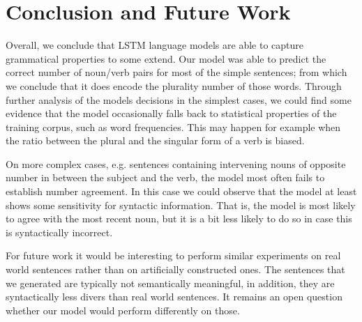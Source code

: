 \documentclass[11pt,a4paper]{article}
\begin{document}





\section{Conclusion and Future Work}
\label{conclusion}


Overall, we conclude that LSTM language models
are able to capture grammatical properties to some extend.
Our model was able to predict the correct number of noun/verb pairs 
for most of the simple sentences;
from which we conclude that it does encode the plurality number of those words. 
Through further analysis of the models decisions in the simplest cases, we could find some evidence that the model occasionally falls back to statistical properties of the training corpus, such as word frequencies.
This may happen for example when the ratio between the plural 
and the singular form of a verb is biased.

On more complex cases, e.g. sentences containing intervening nouns 
of opposite number
in between the subject and the verb, 
the model most often fails to establish number agreement. 
In this case we could observe that the model at least shows 
some sensitivity for syntactic information.
That is, the model is most likely to agree with the
most recent noun, but it is a bit less likely to do so 
in case this is syntactically incorrect.

For future work it would be interesting to perform similar experiments on real world sentences rather than on artificially constructed ones. 
The sentences that we generated are typically not semantically meaningful,
in addition, they are syntactically less divers than real world sentences. 
It remains an open question whether our model would perform differently on those.
\end{document}

